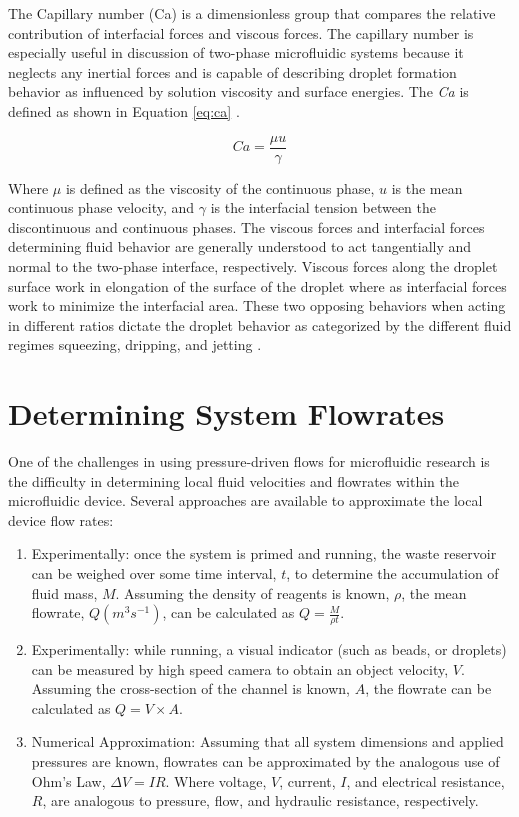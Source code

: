 The Capillary number (Ca) is a dimensionless group that compares the relative contribution of interfacial forces and viscous forces. The capillary number is especially useful in discussion of two-phase microfluidic systems because it neglects any inertial forces and is capable of describing droplet formation behavior as influenced by solution viscosity and surface energies. The \emph{Ca} is defined as shown in Equation \vref{eq:ca} \cite{D??azNafr??a2013}.

\begin{equation}
Ca =\frac {\mu u}{\gamma}
\label{eq:ca}
\end{equation}

Where $\mu$ is defined as the viscosity of the continuous phase, $u$ is the mean continuous phase velocity, and $\gamma$ is the interfacial tension between the discontinuous and continuous phases. The viscous forces and interfacial forces determining fluid behavior are generally understood to act tangentially and normal to the two-phase interface, respectively. Viscous forces along the droplet surface work in elongation of the surface of the droplet where as interfacial forces work to minimize the interfacial area. These two opposing behaviors when acting in different ratios dictate the droplet behavior as categorized by the different fluid regimes squeezing, dripping, and jetting \cite{Shui2007}.


\section{Determining System Flowrates}

One of the challenges in using pressure-driven flows for microfluidic research is the difficulty in determining local fluid velocities and flowrates within the microfluidic device. Several approaches are available to approximate the local device flow rates:
\begin{enumerate}
\item Experimentally: once the system is primed and running, the waste reservoir can be weighed over some time interval, $t$, to determine the accumulation of fluid mass, $M$. Assuming the density of reagents is known, $\rho$, the mean flowrate, $Q (m^3s^{-1})$, can be calculated as $Q = \frac{M}{\rho t}$.
\item Experimentally: while running, a visual indicator (such as beads, or droplets) can be measured by high speed camera to obtain an object velocity, $V$. Assuming the cross-section of the channel is known, $A$, the flowrate can be calculated as $Q = V \times A$.
\item Numerical Approximation: Assuming that all system dimensions and applied pressures are known, flowrates can be approximated by the analogous use of Ohm's Law, $\Delta V=IR$. Where voltage, $V$, current, $I$, and electrical resistance, $R$, are analogous to pressure, flow, and hydraulic resistance, respectively.
\end{enumerate}

